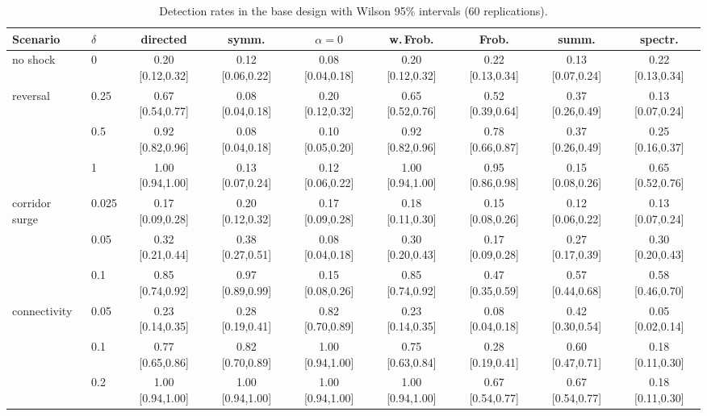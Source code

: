 \documentclass[12pt]{article}
\begin{document}
\begin{table}[h]
\caption{Detection rates in the base design with Wilson 95\% intervals (60 replications).}\label{tab:det}
\centering\tiny
\begin{tabular}{llccccccc}
\toprule
Scenario & $\delta$ & directed & symm. & $\alpha{=}0$ & w.\,Frob. & Frob. & summ. & spectr.\\
\midrule
no shock & 0 & 0.20 {\tiny[0.12,0.32]} & 0.12 {\tiny[0.06,0.22]} & 0.08 {\tiny[0.04,0.18]} & 0.20 {\tiny[0.12,0.32]} & 0.22 {\tiny[0.13,0.34]} & 0.13 {\tiny[0.07,0.24]} & 0.22 {\tiny[0.13,0.34]}\\
reversal & 0.25 & 0.67 {\tiny[0.54,0.77]} & 0.08 {\tiny[0.04,0.18]} & 0.20 {\tiny[0.12,0.32]} & 0.65 {\tiny[0.52,0.76]} & 0.52 {\tiny[0.39,0.64]} & 0.37 {\tiny[0.26,0.49]} & 0.13 {\tiny[0.07,0.24]}\\
 & 0.5 & 0.92 {\tiny[0.82,0.96]} & 0.08 {\tiny[0.04,0.18]} & 0.10 {\tiny[0.05,0.20]} & 0.92 {\tiny[0.82,0.96]} & 0.78 {\tiny[0.66,0.87]} & 0.37 {\tiny[0.26,0.49]} & 0.25 {\tiny[0.16,0.37]}\\
 & 1 & 1.00 {\tiny[0.94,1.00]} & 0.13 {\tiny[0.07,0.24]} & 0.12 {\tiny[0.06,0.22]} & 1.00 {\tiny[0.94,1.00]} & 0.95 {\tiny[0.86,0.98]} & 0.15 {\tiny[0.08,0.26]} & 0.65 {\tiny[0.52,0.76]}\\
corridor surge & 0.025 & 0.17 {\tiny[0.09,0.28]} & 0.20 {\tiny[0.12,0.32]} & 0.17 {\tiny[0.09,0.28]} & 0.18 {\tiny[0.11,0.30]} & 0.15 {\tiny[0.08,0.26]} & 0.12 {\tiny[0.06,0.22]} & 0.13 {\tiny[0.07,0.24]}\\
 & 0.05 & 0.32 {\tiny[0.21,0.44]} & 0.38 {\tiny[0.27,0.51]} & 0.08 {\tiny[0.04,0.18]} & 0.30 {\tiny[0.20,0.43]} & 0.17 {\tiny[0.09,0.28]} & 0.27 {\tiny[0.17,0.39]} & 0.30 {\tiny[0.20,0.43]}\\
 & 0.1 & 0.85 {\tiny[0.74,0.92]} & 0.97 {\tiny[0.89,0.99]} & 0.15 {\tiny[0.08,0.26]} & 0.85 {\tiny[0.74,0.92]} & 0.47 {\tiny[0.35,0.59]} & 0.57 {\tiny[0.44,0.68]} & 0.58 {\tiny[0.46,0.70]}\\
connectivity & 0.05 & 0.23 {\tiny[0.14,0.35]} & 0.28 {\tiny[0.19,0.41]} & 0.82 {\tiny[0.70,0.89]} & 0.23 {\tiny[0.14,0.35]} & 0.08 {\tiny[0.04,0.18]} & 0.42 {\tiny[0.30,0.54]} & 0.05 {\tiny[0.02,0.14]}\\
 & 0.1 & 0.77 {\tiny[0.65,0.86]} & 0.82 {\tiny[0.70,0.89]} & 1.00 {\tiny[0.94,1.00]} & 0.75 {\tiny[0.63,0.84]} & 0.28 {\tiny[0.19,0.41]} & 0.60 {\tiny[0.47,0.71]} & 0.18 {\tiny[0.11,0.30]}\\
 & 0.2 & 1.00 {\tiny[0.94,1.00]} & 1.00 {\tiny[0.94,1.00]} & 1.00 {\tiny[0.94,1.00]} & 1.00 {\tiny[0.94,1.00]} & 0.67 {\tiny[0.54,0.77]} & 0.67 {\tiny[0.54,0.77]} & 0.18 {\tiny[0.11,0.30]}\\

\end{tabular}
\end{table}
\end{document}
